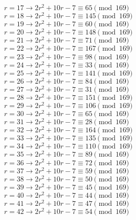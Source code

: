 \documentclass[12pt]{article}
\begin{document}
\begin{itemize}
\begin{multicols}{2}
$r = 17 \rightarrow 2r^2 + 10r - 7 \equiv 65 \pmod{169}$ \\
$r = 18 \rightarrow 2r^2 + 10r - 7 \equiv 145 \pmod{169}$ \\
$r = 19 \rightarrow 2r^2 + 10r - 7 \equiv 60 \pmod{169}$ \\
$r = 20 \rightarrow 2r^2 + 10r - 7 \equiv 148 \pmod{169}$ \\
$r = 21 \rightarrow 2r^2 + 10r - 7 \equiv 71 \pmod{169}$ \\
$r = 22 \rightarrow 2r^2 + 10r - 7 \equiv 167 \pmod{169}$ \\
$r = 23 \rightarrow 2r^2 + 10r - 7 \equiv 98 \pmod{169}$ \\
$r = 24 \rightarrow 2r^2 + 10r - 7 \equiv 33 \pmod{169}$ \\
$r = 25 \rightarrow 2r^2 + 10r - 7 \equiv 141 \pmod{169}$ \\
$r = 26 \rightarrow 2r^2 + 10r - 7 \equiv 84 \pmod{169}$ \\
$r = 27 \rightarrow 2r^2 + 10r - 7 \equiv 31 \pmod{169}$ \\
$r = 28 \rightarrow 2r^2 + 10r - 7 \equiv 151 \pmod{169}$ \\
$r = 29 \rightarrow 2r^2 + 10r - 7 \equiv 106 \pmod{169}$ \\
$r = 30 \rightarrow 2r^2 + 10r - 7 \equiv 65 \pmod{169}$ \\
$r = 31 \rightarrow 2r^2 + 10r - 7 \equiv 28 \pmod{169}$ \\
$r = 32 \rightarrow 2r^2 + 10r - 7 \equiv 164 \pmod{169}$ \\
$r = 33 \rightarrow 2r^2 + 10r - 7 \equiv 135 \pmod{169}$ \\
$r = 34 \rightarrow 2r^2 + 10r - 7 \equiv 110 \pmod{169}$ \\
$r = 35 \rightarrow 2r^2 + 10r - 7 \equiv 89 \pmod{169}$ \\
$r = 36 \rightarrow 2r^2 + 10r - 7 \equiv 72 \pmod{169}$ \\
$r = 37 \rightarrow 2r^2 + 10r - 7 \equiv 59 \pmod{169}$ \\
$r = 38 \rightarrow 2r^2 + 10r - 7 \equiv 50 \pmod{169}$ \\
$r = 39 \rightarrow 2r^2 + 10r - 7 \equiv 45 \pmod{169}$ \\
$r = 40 \rightarrow 2r^2 + 10r - 7 \equiv 44 \pmod{169}$ \\
$r = 41 \rightarrow 2r^2 + 10r - 7 \equiv 47 \pmod{169}$ \\
$r = 42 \rightarrow 2r^2 + 10r - 7 \equiv 54 \pmod{169}$ \\

\end{multicols}
\end{itemize}
\end{document}
